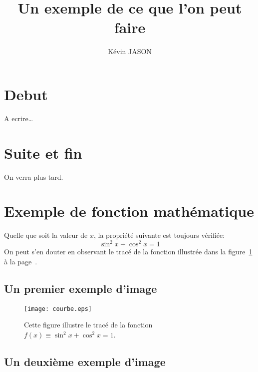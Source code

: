 \documentclass[a4paper,11pt]{article}
\title{Un exemple de ce que l'on peut faire}     %
\author{Kévin JASON}        %
\begin{document}
\maketitle
\tableofcontents
\section{D\’ebut}
\‘A \’ecrire\dots
\section{Suite et fin}
On verra plus tard.

\maketitle                        %
\newpage
\tableofcontents                  %
\newpage
\section{Exemple de fonction mathématique}            %
Quelle que soit la valeur de $x$,
la propriété suivante est toujours
vérifiée: $$\sin^2 x+\cos^2 x=1$$
On peut s'en douter en observant
le tracé de la fonction illustrée
dans la figure~\ref{courbe}
à la page~\pageref{courbe}.
\newpage
\subsection{Un premier exemple d'image}
\begin{figure}[htbp]
\centering
\texttt{[image: courbe.eps]}
\caption{Cette figure illustre
le tracé de la fonction
$f(x)\equiv\sin^2 x+\cos^2 x=1$.}
\label{courbe}
\end{figure}
\newpage
\subsection{Un deuxième exemple d'image}
\begin{figure}[htbp]
\centering
{}
\end{figure}
\end{document}
